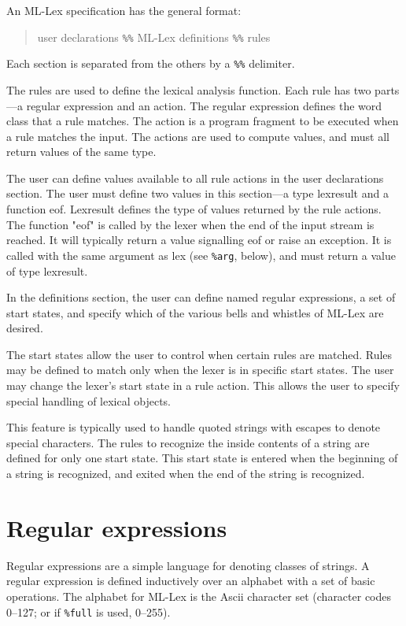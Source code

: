 An ML-Lex specification has the general format:

\begin{quote}
        {user declarations}
        \verb|%%|
        {ML-Lex definitions}
        \verb|%%|
        {rules}
\end{quote}

Each section is separated from the others by a \verb|%%| delimiter.

The rules are used to define the lexical analysis function.  Each
rule has two parts---a regular expression and an action.  The regular
expression defines the word class that a rule matches.  The action is
a program fragment to be executed when a rule matches the input.  The
actions are used to compute values, and must all return values of the
same type.

The user can define values available to all rule actions in the user
declarations section.  The user must define two values in this
section---a type lexresult and a function eof.  Lexresult defines the
type of values returned by the rule actions.  The function "eof" is
called by the lexer when the end of the input stream is reached.  It
will typically return a value signalling eof or raise an exception.
It is called with the same argument as lex (see \verb|%arg|, below),
and must return a value of type lexresult.

In the definitions section, the user can define named regular
expressions, a set of start states, and specify which of the various
bells and whistles of ML-Lex are desired.

The start states allow the user to control when certain rules are
matched.  Rules may be defined to match only when the lexer is in
specific start states.  The user may change the lexer's start state
in a rule action.  This allows the user to specify special handling
of lexical objects.

This feature is typically used to handle quoted strings with escapes
to denote special characters.  The rules to recognize the inside
contents of a string are defined for only one start state.  This
start state is entered when the beginning of a string is recognized,
and exited when the end of the string is recognized.

\section{Regular expressions}

Regular expressions are a simple language for denoting classes of
strings.  A regular expression is defined inductively over an
alphabet with a set of basic operations.  The alphabet for ML-Lex is
the Ascii character set (character codes 0--127; or if 
\verb|%full| is used, 0--255).

